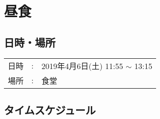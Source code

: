 %

\section{昼食}

\subsection{日時・場所}
\begin{tabular}{p{}rp{}}
  日時 & : & 2019年4月6日(土) 11:55 $\sim$ 13:15 \\
  場所 & : & 食堂
\end{tabular}


\subsection{タイムスケジュール}
